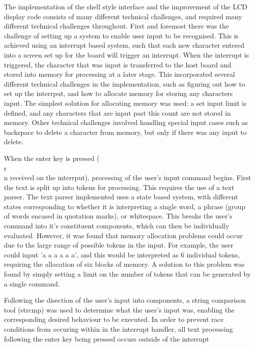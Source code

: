The implementation of the shell style interface and the improvement of the LCD 
display code consists of many different technical challenges, and required many 
different technical challenges throughout. First and foremost there was the 
challenge of setting up a system to enable user input to be recognised. This is 
achieved using an interrupt based system, such that each new character entered 
into a screen set up for the board will trigger an interrupt. When the 
interrupt is triggered, the character that was input is transferred to the host 
board and stored into memory for processing at a later stage. This incorporated 
several different technical challenges in the implementation, such as figuring 
out how to set up the interrput, and how to allocate memory for storing any 
characters input. The simplest solution for allocating memory was used: a set 
input limit is defined, and any characters that are input past this count are 
not stored in memory. Other technical challenges involved handling special input 
cases such as backspace to delete a character from memory, but only if there 
was any input to delete. 
\par\bigskip\noindent
When the enter key is pressed (\\r\\n received on the interrput), processing of the user's 
input command begins. 
First the text is split up into tokens for processing. This 
requires the use of a text parser. The text parser implemented uses a state 
based system, with different states corresponding to whether it is interpreting 
a single word, a phrase (group of words encased in quotation marks), or 
whitespace. This breaks the user's command into it's constituent components, 
which can then be individually evaluated. However, it was found that memory 
allocation problems could occur due to the large range of possible tokens in 
the input. For example, the user could input 'a a a a a a', and this would be 
interpreted as 6 individual tokens, requiring the allocation of six blocks of 
memory. A solution to this problem was found by simply setting a limit on the 
number of tokens that can be generated by a single command. 
\par\bigskip\noindent
Following the disection of the user's input into components, a string 
comparison tool (strcmp) was used to determine what the user's input was, 
enabling the corresponding desired behaviour to be executed. In order to 
prevent race conditions from occuring within in the interrupt handler, all text 
processing following the enter key being pressed occurs outside of the interrupt 
